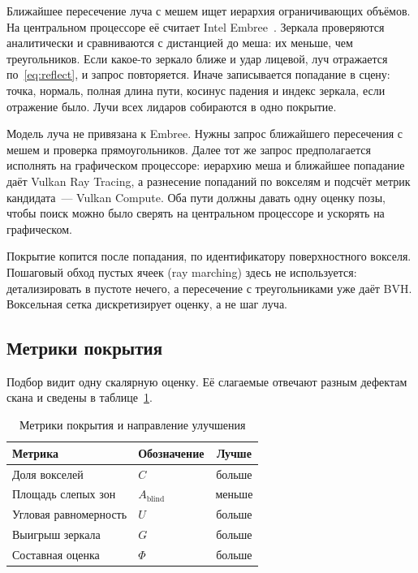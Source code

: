 \documentclass{misisarticle}
\begin{document}
Ближайшее пересечение луча с мешем ищет иерархия ограничивающих объёмов. На центральном процессоре её считает Intel Embree~\cite{wald2014}. Зеркала проверяются аналитически и сравниваются с дистанцией до меша: их меньше, чем треугольников. Если какое-то зеркало ближе и удар лицевой, луч отражается по~\eqref{eq:reflect}, и запрос повторяется. Иначе записывается попадание в сцену: точка, нормаль, полная длина пути, косинус падения и индекс зеркала, если отражение было. Лучи всех лидаров собираются в одно покрытие.

Модель луча не привязана к Embree. Нужны запрос ближайшего пересечения с мешем и проверка прямоугольников. Далее тот же запрос предполагается исполнять на графическом процессоре: иерархию меша и ближайшее попадание даёт Vulkan Ray Tracing, а разнесение попаданий по вокселям и подсчёт метрик кандидата~--- Vulkan Compute. Оба пути должны давать одну оценку позы, чтобы поиск можно было сверять на центральном процессоре и ускорять на графическом.

Покрытие копится после попадания, по идентификатору поверхностного вокселя. Пошаговый обход пустых ячеек (ray marching) здесь не используется: детализировать в пустоте нечего, а пересечение с треугольниками уже даёт BVH. Воксельная сетка дискретизирует оценку, а не шаг луча.

\subsection{Метрики покрытия}

Подбор видит одну скалярную оценку. Её слагаемые отвечают разным дефектам скана и сведены в таблице~\ref{tab:metrics}.

\begin{table}[htbp]
  \caption{Метрики покрытия и направление улучшения}
  \label{tab:metrics}
  \centering
  \begin{tabular}{llc}
    \toprule
    \textbf{Метрика} & \textbf{Обозначение} & \textbf{Лучше} \\
    \toprule
    Доля вокселей & \(C\) & больше \\
    Площадь слепых зон & \(A_{\mathrm{blind}}\) & меньше \\
    Угловая равномерность & \(U\) & больше \\
    Выигрыш зеркала & \(G\) & больше \\
    Составная оценка & \(\Phi\) & больше \\
    \bottomrule
  \end{tabular}
\end{table}
\end{document}
